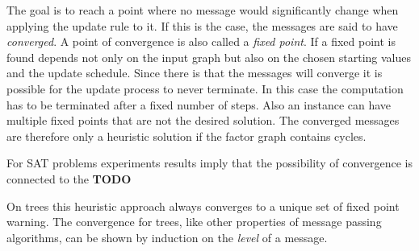 The goal is to reach a point where no message would significantly change when applying the update rule to it. If this is the case, the messages are said to have \emph{converged}. A point of convergence is also called a \emph{fixed point}. If a fixed point is found  depends not only on the input graph but also on the chosen starting values and the update schedule. Since there is that the messages will converge it is possible for the update process to never terminate. In this case the computation has to be terminated after a fixed number of steps. Also an instance can have multiple fixed points that are not the desired solution. The converged messages are therefore only a heuristic solution if the factor graph contains cycles.

For SAT problems experiments results imply that the possibility of convergence is connected to the \textbf{TODO}

On trees this heuristic approach always converges to a unique set of fixed point warning. The convergence for trees, like other properties of message passing algorithms, can be shown by induction on the \textit{level} of a message.

